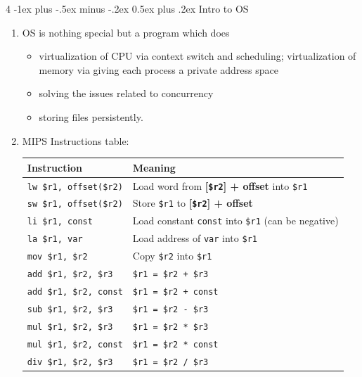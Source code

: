 \documentclass[10pt, landscape]{article}
\makeatletter
\renewcommand{\section}{\@startsection{section}{1}{0mm}%
                                {-1ex plus -.5ex minus -.2ex}%
                                {0.5ex plus .2ex}%
                                {\normalfont\large\bfseries}}
\makeatother
\begin{document}
\begin{multicols}{4}
\section{Intro to OS}
\begin{enumerate}
    \item OS is nothing special but a program which does
    \begin{itemize}
        \item virtualization of CPU via context switch and scheduling; virtualization of memory via giving each process a private address space
        \item solving the issues related to concurrency
        \item storing files persistently.
    \end{itemize}
    \item MIPS Instructions table: \\
    {\centering
    \footnotesize
    \setlength{\tabcolsep}{2.5pt}
    \renewcommand{\arraystretch}{1.1}
    \begin{tabular}{l p{}}
    \hline
    \textbf{Instruction} & \textbf{Meaning} \\
    \hline
    \texttt{lw \$r1, offset(\$r2)} & Load word from \textbf{[\texttt{\$r2}] + offset} into \texttt{\$r1} \\
    \texttt{sw \$r1, offset(\$r2)} & Store \texttt{\$r1} to \textbf{[\texttt{\$r2}] + offset} \\
    \hline
    \texttt{li \$r1, const} & Load constant \texttt{const} into \texttt{\$r1} (can be negative) \\
    \texttt{la \$r1, var} & Load address of \texttt{var} into \texttt{\$r1} \\
    \texttt{mov \$r1, \$r2} & Copy \texttt{\$r2} into \texttt{\$r1} \\
    \texttt{add \$r1, \$r2, \$r3} & \texttt{\$r1 = \$r2 + \$r3} \\
    \texttt{add \$r1, \$r2, const} & \texttt{\$r1 = \$r2 + const} \\
    \texttt{sub \$r1, \$r2, \$r3} & \texttt{\$r1 = \$r2 - \$r3} \\
    \texttt{mul \$r1, \$r2, \$r3} & \texttt{\$r1 = \$r2 * \$r3} \\
    \texttt{mul \$r1, \$r2, const} & \texttt{\$r1 = \$r2 * const} \\
    \texttt{div \$r1, \$r2, \$r3} & \texttt{\$r1 = \$r2 / \$r3} \\

\end{tabular}}
\end{enumerate}
\end{multicols}
\end{document}
